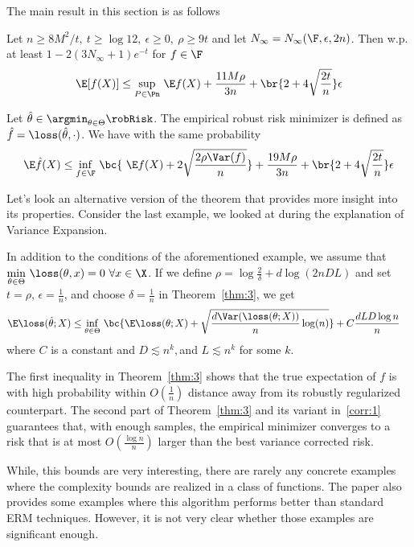 The main result in this section is as follows
\begin{theorem}\label{thm:3}
  Let $n\ge 8M^2/t,~t\ge \log 12,~\epsilon\ge0,~\rho\ge 9t$
  and let $N_\infty = N_\infty(\F,\epsilon,2n)$. Then w.p. at least $1 -
  2(3N_\infty +1)e^{-t}$ for $f\in\F$
  \[ \E[f(X)]\le \underset{P\in\Pn}{\sup}~\E f(X) +
    \frac{11M\rho}{3n} + \br{2 + 4\sqrt{\frac{2t}{n}}}\epsilon\]

  Let $\hat{\theta}\in\argmin_{\theta\in\Theta}\robRisk$. The
  empirical robust risk minimizer is defined as $\hat{f} =
  \loss(\hat{\theta},\cdot)$. We have with the same probability 
 \[ \E\hat{f}(X)\le \underset{f\in\F}{\inf}~\bc{~\E f(X)  +
     2\sqrt{\frac{2\rho \Var(f)}{n}}}+
    \frac{19M\rho}{3n} + \br{ 2+ 4\sqrt{\frac{2t}{n}}}\epsilon\]
  
\end{theorem}
 Let's look an alternative version of the theorem that provides more
 insight into its properties. Consider the last example, we looked at
 during the explanation of Variance Expansion.

 In addition to the conditions of the aforementioned example, we
 assume that $\underset{\theta\in\Theta}{\min}~\loss(\theta, x)
 = 0~\forall x\in\X$. If we define $\rho =
 \log \frac{2}{\delta} + d\log (2nDL)$ and set
 $t=\rho$, $\epsilon=\frac{1}{n}$, and choose $\delta = \frac{1}{n}$
 in Theorem~\ref{thm:3}, we get
 \begin{align}
 \E\loss(\hat{\theta}; X) &\le
   \underset{\theta\in\Theta}{\inf}~\bc{\E\loss(\theta; X) + \sqrt{\frac{d\Var(\loss(\theta;X))}{n}\log (n)
     } }+ C\frac{dLD\log n}{n}
   \label{corr:1}
 \end{align}
where $C$ is a constant and $D\lesssim n^k, $and $L\lesssim n^k$ for
some $k$.


The first inequality in Theorem~\ref{thm:3} shows that the true
expectation of $f$ is with high probability within $O(\frac{1}{n})$
distance away from its robustly regularized counterpart. The second
part of Theorem~\ref{thm:3} and its variant in~\eqref{corr:1}
guarantees that, with enough samples, the empirical minimizer
converges to a risk that is at most $O(\frac{\log n}{n})$
larger than the best variance corrected risk.

While, this bounds are very interesting, there are rarely any concrete
examples where the complexity bounds are realized in a class of
functions. The paper also provides some examples where this algorithm
performs better than standard ERM techniques. However, it is not very
clear whether those examples are significant enough.
